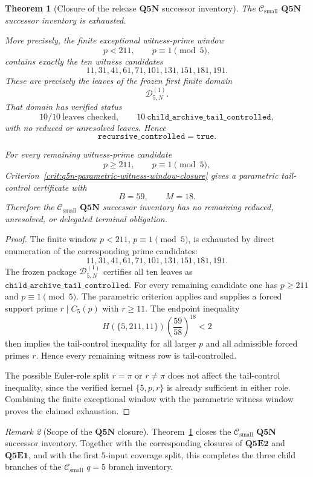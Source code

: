\documentclass[11pt]{article}
\newtheorem{theorem}{Theorem}[section]
\theoremstyle{definition}
\theoremstyle{remark}
\newtheorem{remark}[theorem]{Remark}
\newcommand{\Csmall}{\ensuremath{\mathcal C_{\mathrm{small}}}}
\begin{document}
\begin{theorem}[Closure of the release \texorpdfstring{\(\mathbf{Q5N}\)}{Q5N} successor inventory]
\label{thm:q5n-current-successor-inventory-closed}
The \(\Csmall\) \(\mathbf{Q5N}\) successor inventory is exhausted.

More precisely, the finite exceptional witness-prime window
\[
  p<211,
  \qquad
  p\equiv1\pmod5,
\]
contains exactly the ten witness candidates
\[
  11,31,41,61,71,101,131,151,181,191.
\]
These are precisely the leaves of the frozen first finite domain
\[
  \mathcal D_{5,N}^{(1)}.
\]
That domain has verified status
\[
  10/10\ \text{leaves checked},
  \qquad
  10\ \mathtt{child\_archive\_tail\_controlled},
\]
with no reduced or unresolved leaves.  Hence
\[
  \mathtt{recursive\_controlled}=\mathtt{true}.
\]

For every remaining witness-prime candidate
\[
  p\ge211,
  \qquad
  p\equiv1\pmod5,
\]
Criterion~\ref{crit:q5n-parametric-witness-window-closure} gives a parametric
tail-control certificate with
\[
  B=59,
  \qquad
  M=18.
\]
Therefore the \(\Csmall\) \(\mathbf{Q5N}\) successor inventory has no remaining
reduced, unresolved, or delegated terminal obligation.
\end{theorem}

\begin{proof}
The finite window \(p<211\), \(p\equiv1\pmod5\), is exhausted by direct
enumeration of the corresponding prime candidates:
\[
  11,31,41,61,71,101,131,151,181,191.
\]
The frozen package \(\mathcal D_{5,N}^{(1)}\) certifies all ten leaves as
\(\mathtt{child\_archive\_tail\_controlled}\).  For every remaining candidate
one has \(p\ge211\) and \(p\equiv1\pmod5\).  The parametric criterion applies
and supplies a forced support prime \(r\mid C_5(p)\) with \(r\ge11\).
The endpoint inequality
\[
  H(\{5,211,11\})
  \left(\frac{59}{58}\right)^{18}<2
\]
then implies the tail-control inequality for all larger \(p\) and all admissible
forced primes \(r\).  Hence every remaining witness row is tail-controlled.

The possible Euler-role split \(r=\pi\) or \(r\ne\pi\) does not affect the
tail-control inequality, since the verified kernel \(\{5,p,r\}\) is already
sufficient in either role.  Combining the finite exceptional window with the
parametric witness window proves the claimed exhaustion.
\end{proof}

\begin{remark}[Scope of the \(\mathbf{Q5N}\) closure]
\label{rem:scope-q5n-current-successor-inventory-closed}
Theorem~\ref{thm:q5n-current-successor-inventory-closed} closes the
\(\Csmall\) \(\mathbf{Q5N}\) successor inventory.  Together with the corresponding
closures of \(\mathbf{Q5E2}\) and \(\mathbf{Q5E1}\), and with the first
\(5\)-input coverage split, this completes the three child branches of the
\(\Csmall\) \(q=5\) branch inventory.
\end{remark}
\end{document}
